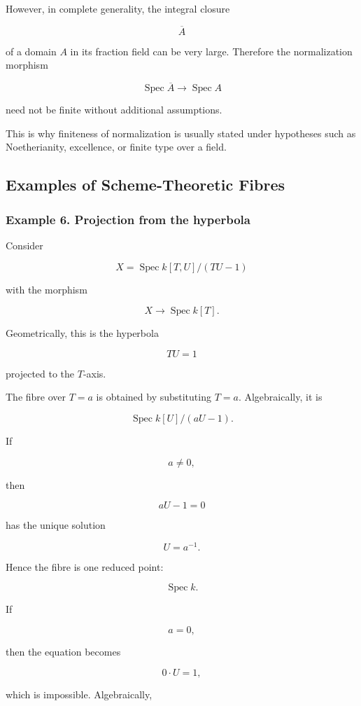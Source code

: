 \documentclass[12pt,a4paper]{article}
\theoremstyle{notespace}
\begin{document}
However, in complete generality, the integral closure

\[
\overline{A}
\]

of a domain \(A\) in its fraction field can be very large. Therefore the normalization morphism

\[
\operatorname{Spec}\overline{A}\to \operatorname{Spec}A
\]

need not be finite without additional assumptions.

This is why finiteness of normalization is usually stated under hypotheses such as Noetherianity, excellence, or finite type over a field.

\subsection{Examples of Scheme-Theoretic Fibres}

\subsubsection{Example 6. Projection from the hyperbola}

Consider

\[
X=\operatorname{Spec}k[T,U]/(TU-1)
\]

with the morphism

\[
X\to \operatorname{Spec}k[T].
\]

Geometrically, this is the hyperbola

\[
TU=1
\]

projected to the \(T\)-axis.

The fibre over \(T=a\) is obtained by substituting \(T=a\). Algebraically, it is

\[
\operatorname{Spec}k[U]/(aU-1).
\]

If

\[
a\neq 0,
\]

then

\[
aU-1=0
\]

has the unique solution

\[
U=a^{-1}.
\]

Hence the fibre is one reduced point:

\[
\operatorname{Spec}k.
\]

If

\[
a=0,
\]

then the equation becomes

\[
0\cdot U=1,
\]

which is impossible. Algebraically,
\end{document}
